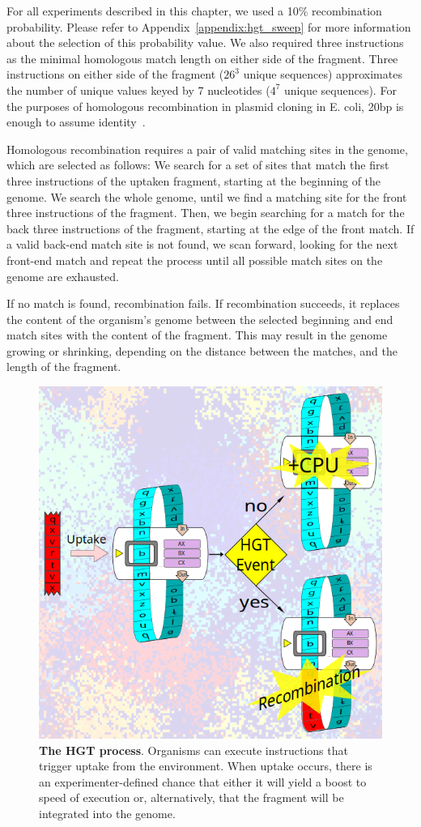 \documentclass[letterpaper]{article}
\begin{document}
For all experiments described in this chapter, we used a 10\% recombination probability. Please refer to Appendix~\ref{appendix:hgt_sweep} for more information about the selection of this probability value. We also required three instructions as the minimal homologous match length on either side of the fragment. Three instructions on either side of the fragment ($26^3$ unique sequences) approximates the number of unique values keyed by 7 nucleotides ($4^7$ unique sequences). For the purposes of homologous recombination in plasmid cloning in E. coli, 20bp is enough to assume identity~\cite{jacobus_optimal_2015}.   

Homologous recombination requires a pair of valid matching sites in the genome, which are selected as follows: We search for a set of sites that match the first three instructions of the uptaken fragment, starting at the beginning of the genome. We search the whole genome, until we find a matching site for the front three instructions of the fragment. Then, we begin searching for a match for the back three instructions of the fragment, starting at the edge of the front match. If a valid back-end match site is not found, we scan forward, looking for the next front-end match and repeat the process until all possible match sites on the genome are exhausted. 

If no match is found, recombination fails. If recombination succeeds, it replaces the content of the organism's genome between the selected beginning and end match sites with the content of the fragment. This may result in the genome growing or shrinking, depending on the distance between the matches, and the length of the fragment.

	\begin{figure}[h!]
	\begin{center}
	\includegraphics[width=0.7\columnwidth]{figures/hgt_figure.png}
	\caption{\textbf{The HGT process}. Organisms can execute instructions that trigger uptake from the environment. When uptake occurs, there is an experimenter-defined chance that either it will yield a boost to speed of execution or, alternatively, that the fragment will be integrated into the genome.
	}\label{fig:hgtprocess}
	\end{center}
	\end{figure}
\end{document}
